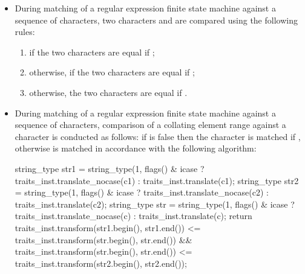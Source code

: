 \begin{itemize}
\item During matching of a regular expression finite state machine
against a sequence of characters, two characters 
and  are compared using the following rules: 
\begin{enumerate}
\item if  the two characters are equal
if ;
%
%
\item otherwise, if  the
two characters are equal if 
;
%
%
%
\item otherwise, the two characters are equal if .
\end{enumerate}

\item During matching of a regular expression finite state machine
against a sequence of characters, comparison of a collating element
range  against a character  is 
conducted as follows: if  is false then the character  is matched if , otherwise  is matched in 
accordance with the following algorithm:

%
%
%
%
%
%
\begin{codeblock}
string_type str1 = string_type(1,
  flags() & icase ?
    traits_inst.translate_nocase(c1) : traits_inst.translate(c1);
string_type str2 = string_type(1,
  flags() & icase ?
    traits_inst.translate_nocase(c2) : traits_inst.translate(c2);
string_type str = string_type(1,
  flags() & icase ?
    traits_inst.translate_nocase(c) : traits_inst.translate(c);
return traits_inst.transform(str1.begin(), str1.end())
      <= traits_inst.transform(str.begin(), str.end())
  && traits_inst.transform(str.begin(), str.end())
      <= traits_inst.transform(str2.begin(), str2.end());
\end{codeblock}


\end{itemize}
